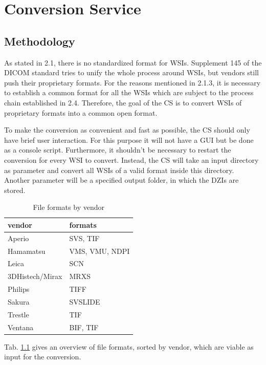 \chapter{Conversion Service}

\section{Methodology}
As stated in 2.1, there is no standardized format for WSIs. Supplement 145 of the DICOM standard tries to unify the whole process around WSIs, but vendors still push their proprietary formats. For the reasons mentioned in 2.1.3, it is necessary to establish a common format for all the WSIs which are subject to the process chain established in 2.4. Therefore, the goal of the CS is to convert WSIs of proprietary formats into a common open format.

To make the conversion as convenient and fast as possible, the CS should only have brief user interaction. For this purpose it will not have a GUI but be done as a console script. Furthermore, it shouldn't be necessary to restart the conversion for every WSI to convert. Instead, the CS will take an input directory as parameter and convert all WSIs of a valid format inside this directory. Another parameter will be a specified output folder, in which the DZIs are stored.

\begin{table}[H]
	\begin{center}
		\begin{tabular}{| l | l |}
			\hline
			\textbf{vendor} & \textbf{formats}\\ \hline
			Aperio & SVS, TIF\\ \hline
			Hamamatsu & VMS, VMU, NDPI\\ \hline
			Leica & SCN\\ \hline
			3DHistech/Mirax & MRXS\\ \hline
			Philips & TIFF\\ \hline
			Sakura & SVSLIDE\\ \hline
			Trestle & TIF\\ \hline
			Ventana & BIF, TIF\\ \hline
		\end{tabular}
		\caption{File formats by vendor}
		\label{tab3.1}
	\end{center}
\end{table}

Tab. \ref{tab3.1} gives an overview of file formats, sorted by vendor, which are viable as input for the conversion.


